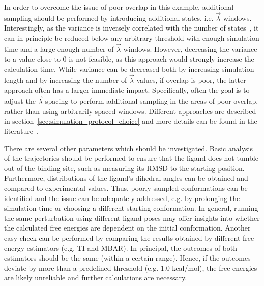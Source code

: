 \documentclass[9pt,bestpractices]{livecoms}
\begin{document}
In order to overcome the issue of poor overlap in this example, additional sampling should be performed by introducing additional states, i.e. $\vec{\lambda}$ windows.
%
Interestingly, as the variance is inversely correlated with the number of states~\cite{klimovich2015guidelines}, it can in principle be reduced below any arbitrary threshold with enough simulation time and a large enough number of $\vec{\lambda}$ windows. However, decreasing the variance to a value close to 0 is not feasible, as this approach would strongly increase the calculation time. While variance can be decreased both by increasing simulation length and by increasing the number of $\vec{\lambda}$ values, if overlap is poor, the latter approach often has a larger immediate impact.  Specifically, often the goal is to adjust the $\vec{\lambda}$ spacing to perform additional sampling in the areas of poor overlap, rather than using arbitrarily spaced windows. Different approaches are described in section~\ref{sec:simulation_protocol_choice} and more details can be found in the literature~\cite{dakka2018concurrent, hahn2019alchemical}.
%

There are several other parameters which should be investigated. Basic analysis of the trajectories should be performed to ensure that the ligand does not tumble out of the binding site, such as measuring its RMSD to the starting position. Furthermore, distributions of the ligand's dihedral angles can be obtained and compared to experimental values. Thus, poorly sampled conformations can be identified and the issue can be adequately addressed, e.g. by prolonging the simulation time or choosing a different starting conformation. In general, running the same perturbation using different ligand poses may offer insights into whether the calculated free energies are dependent on the initial conformation.
Another easy check can be performed by comparing the results obtained by different free energy estimators (e.g. TI and MBAR). In principal, the outcomes of both estimators should be the same (within a certain range). Hence, if the outcomes deviate by more than a predefined threshold (e.g. 1.0 kcal/mol), the free energies are likely unreliable and further calculations are necessary.
%
\end{document}
